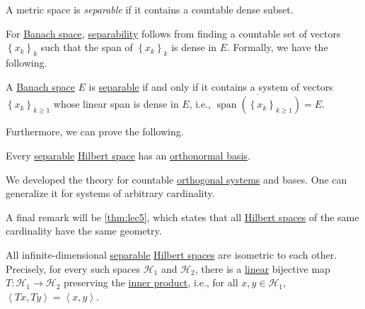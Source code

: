 \begin{definition}[Separable]\label{def:separable}
	A metric space is \emph{separable} if it contains a countable dense subset.
\end{definition}

For \hyperref[def:Banach-space]{Banach space}, \hyperref[def:separable]{separability} follows from finding a countable set of vectors \(\left\{ x_{k}\right\}_k\) such that the span of \(\left\{ x_{k}\right\}_k\) is dense in \(E\). Formally, we have the following.

\begin{lemma}\label{lma:separable-spaces}
	A \hyperref[def:Banach-space]{Banach space} \(E\) is \hyperref[def:separable]{separable} if and only if it contains a system of vectors \(\left\{ x_k \right\} _{k\geq 1}\) whose linear span is dense in \(E\), i.e., \(\overline{\mathop{\mathrm{span}}(\left\{ x_k \right\} _{k\geq 1})} = E\).
\end{lemma}

Furthermore, we can prove the following.

\begin{theorem}
	Every \hyperref[def:separable]{separable} \hyperref[def:Hilbert-space]{Hilbert space} has an \hyperref[def:orthonormal-basis]{orthonormal basis}.
\end{theorem}

\begin{remark}
	We developed the theory for countable \hyperref[def:orthogonal-system]{orthogonal systems} and bases. One can generalize it for systems of arbitrary cardinality.
\end{remark}

A final remark will be \autoref{thm:lec5}, which states that all \hyperref[def:Hilbert-space]{Hilbert spaces} of the same cardinality have the same geometry.

\begin{theorem}\label{thm:lec5}
	All infinite-dimensional \hyperref[def:separable]{separable} \hyperref[def:Hilbert-space]{Hilbert spaces} are isometric to each other. Precisely, for every such spaces \(\mathcal{H} _1\) and \(\mathcal{H} _2\), there is a \hyperref[def:linear-op]{linear} bijective map \(T\colon \mathcal{H} _1 \to \mathcal{H} _2\) preserving the \hyperref[def:inner-product]{inner product}, i.e., for all \(x, y\in \mathcal{H} _1\), \(\left\langle Tx, Ty \right\rangle = \left\langle x, y \right\rangle\).
\end{theorem}

